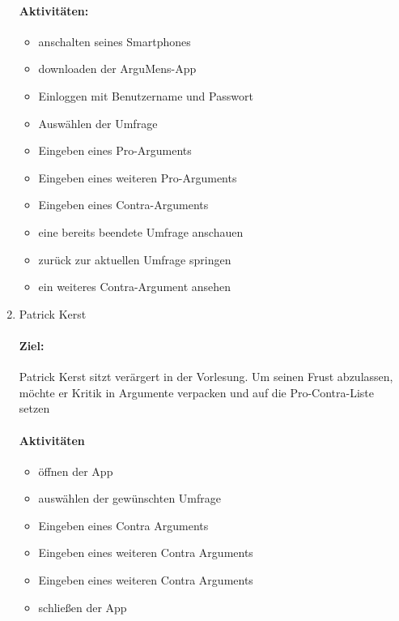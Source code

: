 \begin{enumerate}
\paragraph{Aktivitäten:}
\begin{itemize}
\item anschalten seines Smartphones
\item downloaden der ArguMens-App 
\item Einloggen mit Benutzername und Passwort
\item Auswählen der Umfrage
\item Eingeben eines Pro-Arguments
\item Eingeben eines weiteren Pro-Arguments
\item Eingeben eines Contra-Arguments
\item eine bereits beendete Umfrage anschauen
\item zurück zur aktuellen Umfrage springen
\item ein weiteres Contra-Argument ansehen
\end{itemize}

\item Patrick Kerst

\paragraph{Ziel:} Patrick Kerst sitzt verärgert in der Vorlesung. Um seinen Frust abzulassen, möchte er Kritik in Argumente verpacken und auf die Pro-Contra-Liste setzen

\paragraph{Aktivitäten}
\begin{itemize}
\item öffnen der App
\item auswählen der gewünschten Umfrage
\item Eingeben eines Contra Arguments 
\item Eingeben eines weiteren Contra Arguments 
\item Eingeben eines weiteren Contra Arguments
\item schließen der App 
\end{itemize}
\end{enumerate}

\clearpage